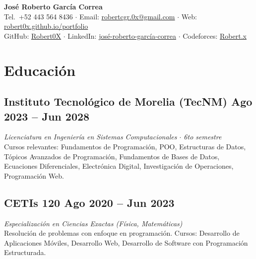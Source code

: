 \documentclass[11pt, a4paper]{article}
\begin{document}
\begin{center}
    {\Large\bfseries\color{darktext} José Roberto García Correa}\\[4pt]
    {\footnotesize\color{secondary}
        Tel.\ +52 443 564 8436 \quad$\cdot$\quad
        Email: \href{mailto:robertcgr.0x@gmail.com}{robertcgr.0x@gmail.com} \quad$\cdot$\quad
        Web: \href{https://robert0x.github.io/portfolio}{robert0x.github.io/portfolio}
    }\\[2pt]
    {\footnotesize\color{secondary}
        GitHub: \href{https://github.com/Robert0X}{Robert0X} \quad$\cdot$\quad
        LinkedIn: \href{https://www.linkedin.com/in/jos\%C3\%A9-roberto-garc\%C3\%ADa-correa-15b37b360/}{josé-roberto-garcía-correa} \quad$\cdot$\quad
        Codeforces: \href{https://codeforces.com/profile/Robert.x}{Robert.x}
    }
\end{center}

\vspace{-0.3em}

\section{Educación}

\subsection[TecNM]{Instituto Tecnológico de Morelia (TecNM) \hfill \textnormal{\footnotesize\color{secondary}Ago 2023 -- Jun 2028}}
\vspace{0.1em}
{\small\textit{\color{secondary}Licenciatura en Ingeniería en Sistemas Computacionales $\cdot$ 6to semestre}}\\[3pt]
{\footnotesize\color{secondary}Cursos relevantes:} {\footnotesize Fundamentos de Programación, POO, Estructuras de Datos, Tópicos Avanzados de Programación, Fundamentos de Bases de Datos, Ecuaciones Diferenciales, Electrónica Digital, Investigación de Operaciones, Programación Web.}

\subsection[CETIs]{CETIs 120 \hfill \textnormal{\footnotesize\color{secondary}Ago 2020 -- Jun 2023}}
\vspace{0.1em}
{\small\textit{\color{secondary}Especialización en Ciencias Exactas (Física, Matemáticas)}}\\[3pt]
{\footnotesize Resolución de problemas con enfoque en programación. Cursos: Desarrollo de Aplicaciones Móviles, Desarrollo Web, Desarrollo de Software con Programación Estructurada.}
\end{document}

